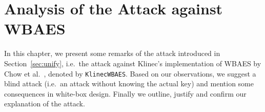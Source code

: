 \chapter{Analysis of the Attack against WBAES}
\label{chap:analysis}

In this chapter, we present some remarks of the attack introduced in Section~\ref{sec:unify}, i.e.\ the attack against Klinec's implementation \cite{klinec2013implementation} of WBAES by Chow et al.\ \cite{chow2002aes}, denoted by {\tt KlinecWBAES}. Based on our observations, we suggest a blind attack (i.e.\ an attack without knowing the actual key) and mention some consequences in white-box design. %
Finally we outline, justify and confirm our explanation of the attack.









